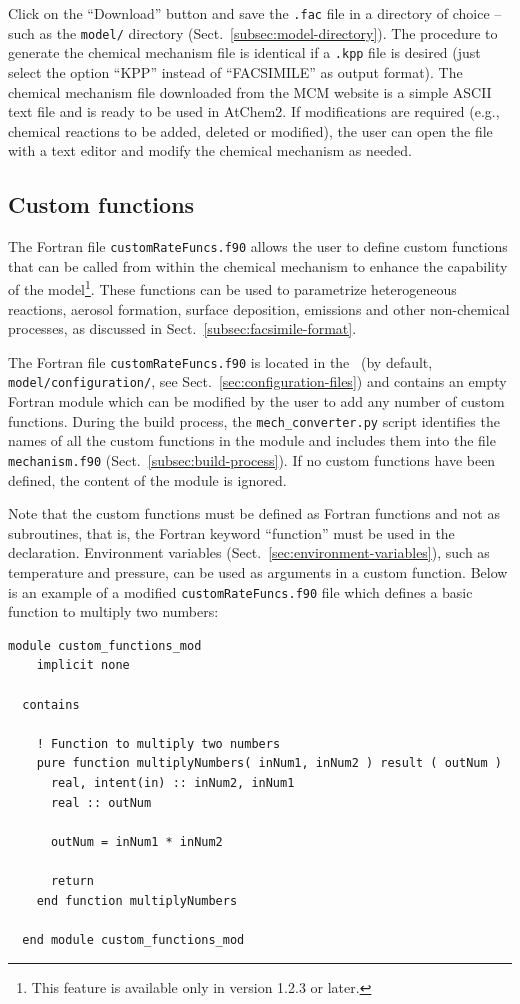 Click on the ``Download'' button and save the \texttt{.fac} file in
a directory of choice -- such as the \texttt{model/} directory
(Sect.~\ref{subsec:model-directory}). The procedure to generate the
chemical mechanism file is identical if a \texttt{.kpp} file is
desired (just select the option ``KPP'' instead of ``FACSIMILE'' as
output format). The chemical mechanism file downloaded from the MCM
website is a simple ASCII text file and is ready to be used in
AtChem2. If modifications are required (e.g., chemical reactions to be
added, deleted or modified), the user can open the file with a text
editor and modify the chemical mechanism as needed.

\subsection{Custom functions} \label{subsec:custom-functions}

The Fortran file \texttt{customRateFuncs.f90} allows the user to define custom functions that
can be called from within the chemical mechanism to enhance the capability of the
model\footnote{This feature is available only in version 1.2.3 or later.}. These
functions can be used to parametrize heterogeneous reactions, aerosol formation, surface
deposition, emissions and other non-chemical processes, as discussed in
Sect.~\ref{subsec:facsimile-format}.

The Fortran file \texttt{customRateFuncs.f90} is located in the \configdir\ (by default,
\texttt{model/configuration/}, see Sect.~\ref{sec:configuration-files}) and contains an empty Fortran
module which can be modified by the user to add any number of custom functions. During the
build process, the \texttt{mech\_converter.py} script identifies the names of all the custom
functions in the module and includes them into the file \texttt{mechanism.f90}
(Sect.~\ref{subsec:build-process}). If no custom functions have been defined, the content of
the module is ignored.

Note that the custom functions must be defined as Fortran functions and not as subroutines,
that is, the Fortran keyword ``function'' must be used in the declaration. Environment
variables (Sect.~\ref{sec:environment-variables}), such as temperature and pressure, can be
used as arguments in a custom function. Below is an example of a modified
\texttt{customRateFuncs.f90} file which defines a basic function to multiply two numbers:

\begin{Verbatim}[fontsize=\small]
  module custom_functions_mod
    implicit none

  contains

    ! Function to multiply two numbers
    pure function multiplyNumbers( inNum1, inNum2 ) result ( outNum )
      real, intent(in) :: inNum2, inNum1
      real :: outNum

      outNum = inNum1 * inNum2

      return
    end function multiplyNumbers

  end module custom_functions_mod
\end{Verbatim}

